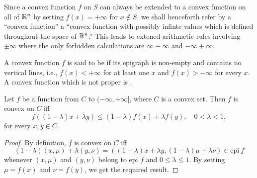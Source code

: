 \documentclass[11pt,a4paper]{article}
\begin{document}
\begin{remark}
% 
    Since a convex function $f$ on $S$ can always be extended to a convex function on all of $\mathbb{R}^n$ by setting $f(x) = +\infty$ for $x\notin S$, we shall henceforth refer by a ``convex function'' a  ``convex function with possibly infinte values which is defined throughout the space of $\mathbb{R}^n$.'' This leads to extened arithmetic rules involving $\pm \infty$ where the only forbidden calculations are $\infty -\infty$ and $-\infty + \infty$.
\end{remark}

\begin{definition}
    A convex function $f$ is said to be  if its epigraph is non-empty and contains no vertical lines, i.e., $f(x)<+\infty$ for at least one $x$ and $f(x)>-\infty$ for every $x$. A convex function which is not proper is .
\end{definition}


\begin{theorem}\label{thm:convex_function_def}
    Let $f$ be a function from $C$ to $(-\infty,+\infty]$, where $C$ is a convex set. Then $f$ is convex on $C$ iff 
    \begin{equation*}
        f((1-\lambda)x+\lambda y) \le (1-\lambda) f(x) + \lambda f(y), \quad 0<\lambda < 1,
    \end{equation*}
    for every $x,y\in C$.
\end{theorem}

\begin{proof}
    By definition, $f$ is convex on $C$ iff 
    \begin{equation*}
        (1-\lambda)(x,\mu) + \lambda (y,\nu) = ((1-\lambda)x+\lambda y,(1-\lambda)\mu+\lambda \nu) \in \text{epi}\ f
    \end{equation*}
    whenever $(x,\mu)$ and $(y,\nu)$ belong to epi $f$ and $0\le\lambda\le 1$. By setting $\mu = f(x)$ and $\nu = f(y)$, we get the required result.
\end{proof}
\end{document}
